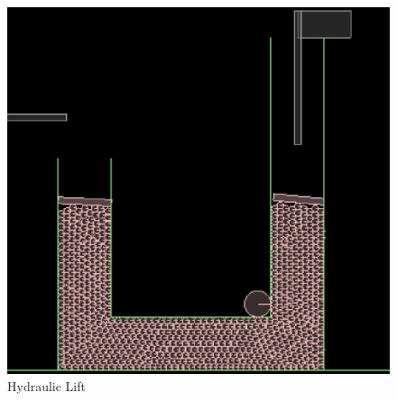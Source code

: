 \documentclass[a4paper,11pt]{article}
\begin{document}
{\begin{figure}[h]
    \centering
    \label{fig:image9}
    \includegraphics[scale=0.3]{images/image9}
    \caption{Hydraulic Lift}
\end{figure}

}

\newpage
\end{document}
